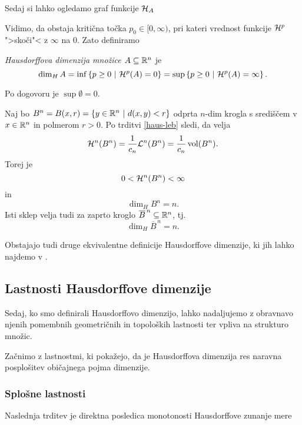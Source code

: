 Sedaj si lahko ogledamo graf funkcije \(\mathcal{H}_A\)
\begin{center}
    \drawGraf
\end{center}
Vidimo, da obstaja kritična točka \(p_0 \in [0, \infty)\), pri kateri vrednost funkcije \(\mathcal{H}^p\) ">skoči"< z \(\infty\) na \(0\). Zato definiramo

\begin{definicija}
    \emph{Hausdorffova dimenzija množice \(A \subseteq \mathbb{R}^n\)} je 
    \[\dim_H A = \inf \left\{p \geq 0 \ | \ \mathcal{H}^{p}(A) = 0\right\} = \sup \left\{p \geq 0 \ | \ \mathcal{H}^{p}(A) = \infty\right\}.\]
\end{definicija}

\begin{opomba} 
    Po dogovoru je \(\sup \emptyset = 0\).
\end{opomba}

\begin{zgled}
    \label{dim-ball}
    Naj bo \(B^n = B(x, r) = \left\{y \in \mathbb{R}^n \ | \ d(x, y) < r\right\}\) odprta \(n\)-dim krogla s središčem v \(x \in \mathbb{R}^n\) in polmerom \(r > 0\). Po trditvi \ref{haus-leb} sledi, da velja
    \[\mathcal{H}^n(B^n) = \frac{1}{c_n} \mathcal{L}^n(B^n) = \frac{1}{c_n} \operatorname{vol}(B^n).\]
    Torej je 
    \[0 < \mathcal{H}^n(B^n) < \infty\]
    in 
    \[\dim_H B^n = n.\]
    Isti sklep velja tudi za zaprto kroglo \(\overline{B}^{\, n} \subseteq \mathbb{R}^n\), tj.
    \[\dim_H \overline{B}^{\, n} = n.\]
\end{zgled}

\begin{opomba}
    Obstajajo tudi druge ekvivalentne definicije Hausdorffove dimenzije, ki jih lahko najdemo v \cite{fk-fg}.
\end{opomba}

\subsection{Lastnosti Hausdorffove dimenzije}
Sedaj, ko smo definirali Hausdorffovo dimenzijo, lahko nadaljujemo z obravnavo njenih pomembnih geometričnih in topoloških lastnosti ter vpliva na strukturo množic.

Začnimo z lastnostmi, ki pokažejo, da je Hausdorffova dimenzija res naravna posplošitev običajnega pojma dimenzije.

\subsubsection{Splošne lastnosti}
Naslednja trditev je direktna posledica monotonosti Hausdorffove zunanje mere 

